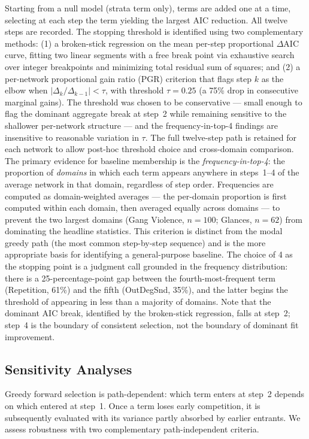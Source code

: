 \documentclass[11pt]{article}
\begin{document}
Starting from a null model (strata term only), terms are added one at a time,
selecting at each step the term yielding the largest AIC reduction. All twelve
steps are recorded. The stopping threshold is identified using two complementary
methods: (1) a broken-stick regression on the mean per-step proportional
$\Delta$AIC curve, fitting two linear segments with a free break point via
exhaustive search over integer breakpoints and minimizing total residual sum of
squares; and (2) a per-network proportional gain ratio
(PGR) criterion that flags step $k$ as the elbow when
$|\Delta_k / \Delta_{k-1}| < \tau$, with threshold $\tau = 0.25$ (a 75\% drop
in consecutive marginal gains). The threshold was chosen to be conservative
--- small enough to flag the dominant aggregate break at step~2 while
remaining sensitive to the shallower per-network structure --- and the
frequency-in-top-4 findings are insensitive to reasonable variation in $\tau$.
The full twelve-step path is retained for each network to allow post-hoc
threshold choice and cross-domain comparison. The primary evidence for baseline
membership is the \emph{frequency-in-top-4}: the proportion of \emph{domains}
in which each term appears anywhere in steps~1--4 of the average network in
that domain, regardless of step order. Frequencies are computed as
domain-weighted averages --- the per-domain proportion is first computed
within each domain, then averaged equally across domains --- to prevent the
two largest domains (Gang Violence, $n=100$; Glances, $n=62$) from dominating
the headline statistics. This criterion is distinct from the modal greedy path
(the most common step-by-step sequence) and is the more appropriate basis for
identifying a general-purpose baseline. The choice of 4 as the stopping point
is a judgment call grounded in the frequency distribution: there is a
25-percentage-point gap between the fourth-most-frequent term (Repetition,
61\%) and the fifth (OutDegSnd, 35\%), and the latter begins the threshold of appearing in less than a majority of domains.
Note that the dominant AIC break, identified by the broken-stick regression,
falls at step~2; step~4 is the boundary of consistent selection, not the
boundary of dominant fit improvement.

\subsection{Sensitivity Analyses}

Greedy forward selection is path-dependent: which term enters at step~2 depends
on which entered at step~1. Once a term loses early competition, it is
subsequently evaluated with its variance partly absorbed by earlier entrants.
We assess robustness with two complementary path-independent criteria.
\end{document}
